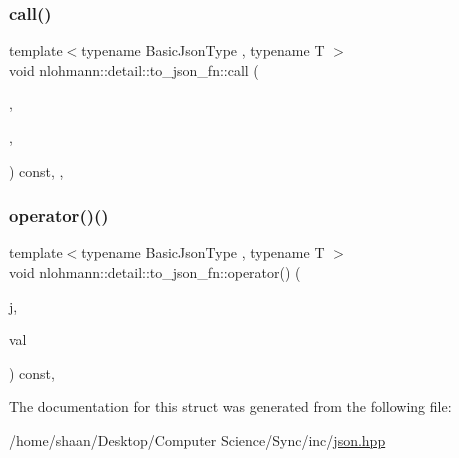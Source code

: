 \subsubsection{\texorpdfstring{call()}{call()}\hspace{0.1cm}{\footnotesize\ttfamily [2/2]}}
{\footnotesize\ttfamily template$<$typename Basic\+Json\+Type , typename T $>$ \\
void nlohmann\+::detail\+::to\+\_\+json\+\_\+fn\+::call (\begin{DoxyParamCaption}\item[{Basic\+Json\+Type \&}]{,  }\item[{T \&\&}]{,  }\item[{\hyperlink{structnlohmann_1_1detail_1_1priority__tag}{priority\+\_\+tag}$<$ 0 $>$}]{ }\end{DoxyParamCaption}) const\hspace{0.3cm}{\ttfamily [inline]}, {\ttfamily [private]}, {\ttfamily [noexcept]}}

\mbox{\label{structnlohmann_1_1detail_1_1to__json__fn_ac63f82d3eed085522f1cbe99a521a4d4}} 
\subsubsection{\texorpdfstring{operator()()}{operator()()}}
{\footnotesize\ttfamily template$<$typename Basic\+Json\+Type , typename T $>$ \\
void nlohmann\+::detail\+::to\+\_\+json\+\_\+fn\+::operator() (\begin{DoxyParamCaption}\item[{Basic\+Json\+Type \&}]{j,  }\item[{T \&\&}]{val }\end{DoxyParamCaption}) const\hspace{0.3cm}{\ttfamily [inline]}, {\ttfamily [noexcept]}}



The documentation for this struct was generated from the following file\+:\begin{DoxyCompactItemize}
\item 
/home/shaan/\+Desktop/\+Computer Science/\+Sync/inc/\hyperlink{json_8hpp}{json.\+hpp}\end{DoxyCompactItemize}
